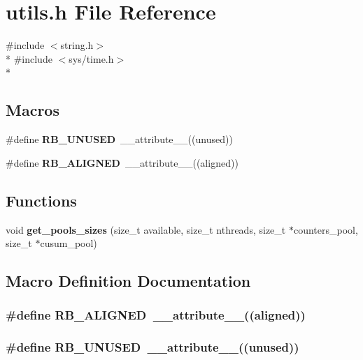 \section{utils.\+h File Reference}
\label{utils_8h}
{\ttfamily \#include $<$string.\+h$>$}\\*
{\ttfamily \#include $<$sys/time.\+h$>$}\\*
\subsection*{Macros}
\begin{DoxyCompactItemize}
\item 
\#define {\bf R\+B\+\_\+\+U\+N\+U\+S\+E\+D}~\+\_\+\+\_\+attribute\+\_\+\+\_\+((unused))
\item 
\#define {\bf R\+B\+\_\+\+A\+L\+I\+G\+N\+E\+D}~\+\_\+\+\_\+attribute\+\_\+\+\_\+((aligned))
\end{DoxyCompactItemize}
\subsection*{Functions}
\begin{DoxyCompactItemize}
\item 
void {\bf get\+\_\+pools\+\_\+sizes} (size\+\_\+t available, size\+\_\+t nthreads, size\+\_\+t $\ast$counters\+\_\+pool, size\+\_\+t $\ast$cusum\+\_\+pool)
\end{DoxyCompactItemize}


\subsection{Macro Definition Documentation}
\subsubsection[{R\+B\+\_\+\+A\+L\+I\+G\+N\+E\+D}]{\setlength{\rightskip}{0pt plus 5cm}\#define R\+B\+\_\+\+A\+L\+I\+G\+N\+E\+D~\+\_\+\+\_\+attribute\+\_\+\+\_\+((aligned))}\label{utils_8h_aa0e709ee523d90640a5a85da2f92f490}
\subsubsection[{R\+B\+\_\+\+U\+N\+U\+S\+E\+D}]{\setlength{\rightskip}{0pt plus 5cm}\#define R\+B\+\_\+\+U\+N\+U\+S\+E\+D~\+\_\+\+\_\+attribute\+\_\+\+\_\+((unused))}\label{utils_8h_aed6a24603cc3878dddf16b3c213287ca}


